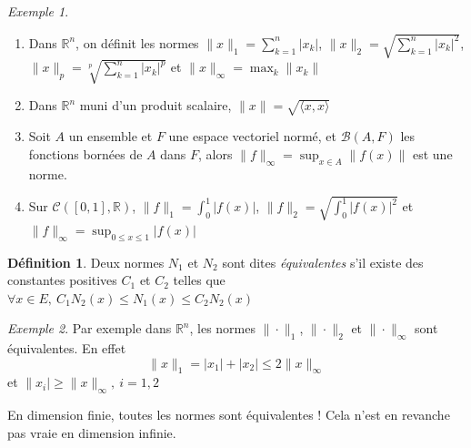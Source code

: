 \documentclass[]{article}
\theoremstyle{remark}
\newtheorem{myexmpl}{Exemple}
\theoremstyle{definition}
\newtheorem{mydef}{Définition}
\begin{document}
\begin{myexmpl}
	\leavevmode
	\begin{enumerate}
		\item Dans $\mathbb{R}^n$, on définit les normes $\displaystyle \|x\|_1= \sum_{k=1}^n |x_k|$, $\displaystyle \|x\|_2 =  \sqrt{\sum_{k=1}^n |x_k|^2}$, $\displaystyle \|x\|_p = \sqrt[p]{\sum_{k=1}^n |x_k|^p}$ et $\displaystyle \|x\|_\infty = \max_{k} \|x_k\|$
		\item Dans $\mathbb{R}^n$ muni d'un produit scalaire, $\|x\| = \sqrt{\langle x, x\rangle}$
		\item Soit $A$ un ensemble et $F$ une espace vectoriel normé, et $\mathcal{B}(A, F)$ les fonctions bornées de $A$ dans $F$, alors $\displaystyle \|f\|_\infty = \sup_{x \in A} \|f(x)\|$ est une norme.
		\item Sur $\mathcal{C}([0, 1], \mathbb{R})$, $\displaystyle \|f\|_1 = \int_{0}^{1}\left|f(x)\right|$, $\displaystyle \|f\|_2 = \sqrt{\int_{0}^{1}\left|f(x)\right|^2}$ et$\displaystyle \|f\|_\infty = \sup_{0 \leqslant x \leqslant 1}\left|f(x)\right|$
	\end{enumerate}
\end{myexmpl}

\begin{mydef}
	Deux normes $N_1$ et $N_2$ sont dites \textit{équivalentes} s'il existe des constantes positives $C_1$ et $C_2$ telles que $\forall x \in E, ~ C_1 N_2(x) \leqslant N_1(x) \leqslant C_2 N_2(x)$
\end{mydef}

\begin{myexmpl}
	Par exemple dans $\mathbb{R}^n$, les normes $\|\cdot\|_1$, $\|\cdot\|_2$ et $\|\cdot\|_\infty$ sont équivalentes. En effet $$\|x\|_1=|x_1|+|x_2| \leqslant 2 \|x\|_\infty$$ et $\|x_i| \geqslant \|x\|_\infty, ~ i=1, 2$
\end{myexmpl}

En dimension finie, toutes les normes sont équivalentes ! Cela n'est en revanche pas vraie en dimension infinie.
\end{document}
